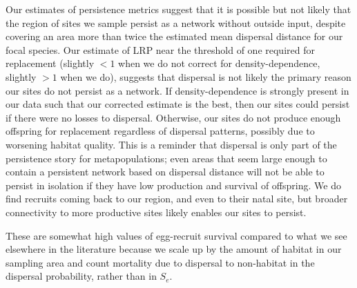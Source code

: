 \documentclass[12pt, oneside]{article}   	%
\begin{document}
Our estimates of persistence metrics suggest that it is possible but not likely that the region of sites we sample persist as a network without outside input, despite covering an area more than twice the estimated mean dispersal distance for our focal species. Our estimate of LRP near the threshold of one required for replacement (slightly $ < 1$ when we do not correct for density-dependence, slightly $ > 1$ when we do), suggests that dispersal is not likely the primary reason our sites do not persist as a network. If density-dependence is strongly present in our data such that our corrected estimate is the best, then our sites could persist if there were no losses to dispersal. Otherwise, our sites do not produce enough offspring for replacement regardless of dispersal patterns, possibly due to worsening habitat quality. This is a reminder that dispersal is only part of the persistence story for metapopulations; even areas that seem large enough to contain a persistent network based on dispersal distance will not be able to persist in isolation if they have low production and survival of offspring. We do find recruits coming back to our region, and even to their natal site, but broader connectivity to more productive sites likely enables our sites to persist.

These are somewhat high values of egg-recruit survival compared to what we see elsewhere in the literature \citep[e.g.][]{rumrill_natural_1990, metaxas_quantifying_2009} \citep[though not unreasonable, e.g.][]{white2014planktonic, johnson2018integrating} because we scale up by the amount of habitat in our sampling area and count mortality due to dispersal to non-habitat in the dispersal probability, rather than in $S_e$. 


\end{document}
